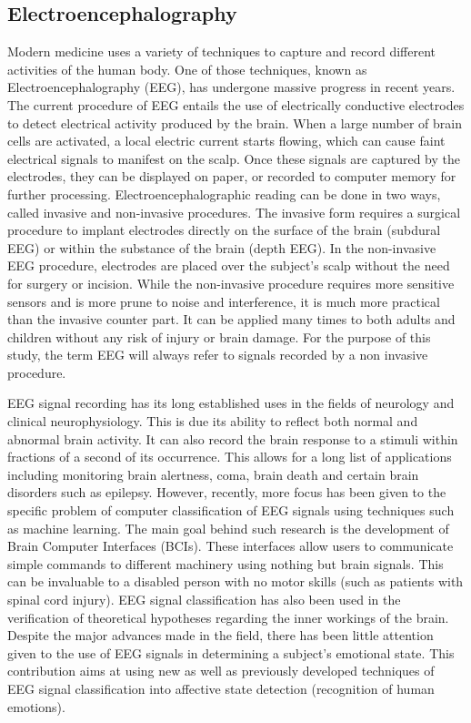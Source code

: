 \documentclass[12pt, a4paper, fleqn]{memoir}%
\begin{document}
\subsection{Electroencephalography}
Modern medicine uses a variety of techniques to capture and record different activities of the human body. One of those techniques, known as Electroencephalography (EEG), has undergone massive progress in recent years. The current procedure of EEG entails the use of electrically conductive electrodes to detect electrical activity produced by the brain. When a large number of brain cells are activated, a local electric current starts flowing, which can cause faint electrical signals to manifest on the scalp. Once these signals are captured by the electrodes, they can be displayed on paper, or recorded to computer memory for further processing. Electroencephalographic reading can be done in two ways, called invasive and non-invasive procedures. The invasive form requires a surgical procedure to implant electrodes directly on the surface of the brain (subdural EEG) or within the substance of the brain (depth EEG). In the non-invasive EEG procedure, electrodes are placed over the subject's scalp without the need for surgery or incision. While the non-invasive procedure requires more sensitive sensors and is more prune to noise and interference, it is much more practical than the invasive counter part. It can be applied many times to both adults and children without any risk of injury or brain damage\cite{teplan2002fundamentals}. For the purpose of this study, the term EEG will always refer to signals recorded by a non invasive procedure.

EEG signal recording has its long established uses in the fields of neurology and clinical neurophysiology. This is due its ability to reflect both normal and abnormal brain activity. It can also record the brain response to a stimuli within fractions of a second of its occurrence. This allows for a long list of applications including monitoring brain alertness, coma, brain death and certain brain disorders such as epilepsy. However, recently, more focus has been given to the specific problem of computer classification of EEG signals using techniques such as machine learning. The main goal behind such research is the development of Brain Computer Interfaces (BCIs). These interfaces allow users to communicate simple commands to different machinery using nothing but brain signals. This can be invaluable to a disabled person with no motor skills (such as patients with spinal cord injury). EEG signal classification has also been used in the verification of theoretical hypotheses regarding the inner workings of the brain. Despite the major advances made in the field, there has been little attention given to the use of EEG signals in determining a subject's emotional state. This contribution aims at using new as well as previously developed techniques of EEG signal classification into affective state detection (recognition of human emotions). 
\end{document}
